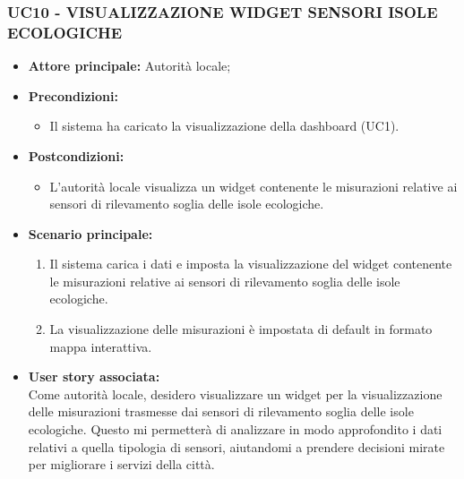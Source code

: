 \subsubsection{UC10 - VISUALIZZAZIONE WIDGET SENSORI ISOLE ECOLOGICHE}
\begin{itemize}
    \item \textbf{Attore principale:} Autorità locale;
    \item \textbf{Precondizioni:}
        \begin{itemize}
            \item Il sistema ha caricato la visualizzazione della dashboard (UC1).
        \end{itemize}
    \item \textbf{Postcondizioni:}
        \begin{itemize}
            \item L'autorità locale visualizza un widget contenente le misurazioni relative ai sensori di rilevamento soglia delle isole ecologiche.
        \end{itemize}
        \item \textbf{Scenario principale:}
        \begin{enumerate}
            \item Il sistema carica i dati e imposta la visualizzazione del widget contenente le misurazioni relative ai sensori di rilevamento soglia delle isole ecologiche.
            \item La visualizzazione delle misurazioni è impostata di default in formato mappa interattiva.
        \end{enumerate}
    \item \textbf{User story associata:} \\
        Come autorità locale, desidero visualizzare un widget per la visualizzazione delle misurazioni trasmesse dai sensori di rilevamento soglia delle isole ecologiche. Questo mi permetterà di analizzare in modo approfondito i dati relativi a quella tipologia di sensori, aiutandomi a prendere decisioni mirate per migliorare i servizi della città.
\end{itemize}